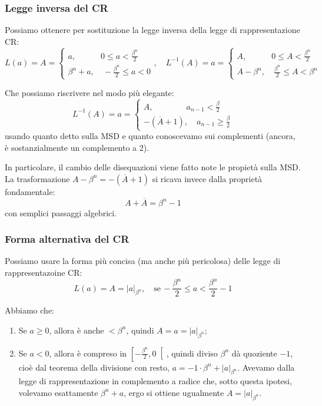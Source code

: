 \documentclass[a4paper,11pt]{article}
\begin{document}
\subsubsection{Legge inversa del CR}
Possiamo ottenere per sostituzione la legge inversa della legge di rappresentazione CR:
\[
		L(a) = A =	
	\begin{cases}
		a, \quad \quad \quad  0 \leq a < \frac{\beta^n}{2} \\ 
		\beta^n + a, \quad -\frac{\beta^n}{2} \leq a < 0
	\end{cases}, \quad 
		L^{-1}(A) = a =
	\begin{cases}
		A, \quad \quad \quad 0 \leq A < \frac{\beta^n}{2} \\ 
		A - \beta^n, \quad \frac{\beta^n}{2} \leq A < \beta^n 
	\end{cases} 
\]

Che possiamo riscrivere nel modo più elegante:
\[
	L^{-1}(A) = a =
	\begin{cases}			
		A, \quad \quad \quad \quad a_{n-1} < \frac{\beta}{2} \\ 
		-\left( \overline{A} + 1 \right), \quad a_{n-1} \geq \frac{\beta}{2} 
	\end{cases}
\]
usando quanto detto sulla MSD e quanto conoscevamo sui complementi (ancora, è sostanzialmente un complemento a 2).

In particolare, il cambio delle disequazioni viene fatto note le propietà sulla MSD.
La trasformazione $A - \beta^n = -\left( \overline{A} + 1 \right)$ si ricava invece dalla proprietà fondamentale:
$$
A + \overline{A} = \beta^n - 1
$$
con semplici passaggi algebrici.

\subsubsection{Forma alternativa del CR}
Possiamo usare la forma più concisa (ma anche più pericolosa) delle legge di rappresentazoine CR:
\[
	L(a) = A = |a|_{\beta^n}, \quad \text{se} \, -\frac{\beta^n}{2} \leq a < \frac{\beta^n}{2} - 1
\]

Abbiamo che:
\begin{enumerate}
	\item Se $a \geq 0$, allora è anche $< \beta^n$, quindi $A = a = |a|_{\beta^n}$;
	\item Se $a < 0$, allora è compreso in $\left[ -\frac{\beta^n}{2}, 0 \right[$, quindi diviso $\beta^n$ dà quoziente $-1$, cioè dal teorema della divisione con resto, $a = -1\cdot \beta^n + |a|_{\beta^n}$.
			Avevamo dalla legge di rappresentazione in complemento a radice che, sotto questa ipotesi, volevamo esattamente $\beta^n + a$, ergo si ottiene ugualmente $A = |a|_{\beta^n}$.
\end{enumerate}
\end{document}
